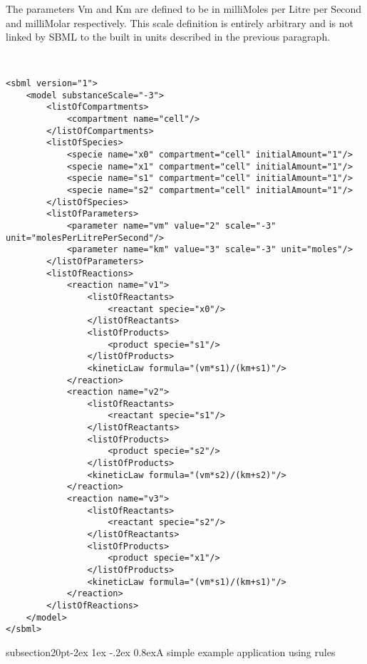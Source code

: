 \documentclass[10pt]{article}
\makeatletter
\renewcommand{\subsection}{\@startsection%
  {subsection}{2}{0pt}{-2ex \@plus 1ex \@minus -.2ex}%
  {0.8ex}{\slshape\large\bfseries}}
\newcommand{\tightspacing}{\renewcommand{\baselinestretch}{0.85}}
\newcommand{\regularspacing}{\renewcommand{\baselinestretch}{1.0}}
\makeatother
\begin{document}
The parameters Vm and Km are defined to be in milliMoles per
Litre per Second and milliMolar respectively. This scale
definition is entirely arbitrary and is not linked by SBML to the
built in units described in the previous paragraph.

\begin{small}
\tightspacing
\begin{verbatim}


<sbml version="1">
    <model substanceScale="-3">
        <listOfCompartments>
            <compartment name="cell"/>
        </listOfCompartments>
        <listOfSpecies>
            <specie name="x0" compartment="cell" initialAmount="1"/>
            <specie name="x1" compartment="cell" initialAmount="1"/>
            <specie name="s1" compartment="cell" initialAmount="1"/>
            <specie name="s2" compartment="cell" initialAmount="1"/>
        </listOfSpecies>
        <listOfParameters>
            <parameter name="vm" value="2" scale="-3" unit="molesPerLitrePerSecond"/>
            <parameter name="km" value="3" scale="-3" unit="moles"/>
        </listOfParameters>
        <listOfReactions>
            <reaction name="v1">
                <listOfReactants>
                    <reactant specie="x0"/>
                </listOfReactants>
                <listOfProducts>
                    <product specie="s1"/>
                </listOfProducts>
                <kineticLaw formula="(vm*s1)/(km+s1)"/>
            </reaction>
            <reaction name="v2">
                <listOfReactants>
                    <reactant specie="s1"/>
                </listOfReactants>
                <listOfProducts>
                    <product specie="s2"/>
                </listOfProducts>
                <kineticLaw formula="(vm*s2)/(km+s2)"/>
            </reaction>
            <reaction name="v3">
                <listOfReactants>
                    <reactant specie="s2"/>
                </listOfReactants>
                <listOfProducts>
                    <product specie="x1"/>
                </listOfProducts>
                <kineticLaw formula="(vm*s1)/(km+s1)"/>
            </reaction>
        </listOfReactions>
    </model>
</sbml>
\end{verbatim}
  \regularspacing
\end{small}


\subsection{A simple example application using rules}
\label{subsection:ruleseg}
\end{document}

